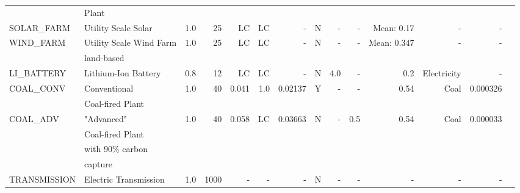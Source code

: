\begin{tabular}{llrrrrrrrrrrrr}
     &Plant&&&&&&&&&&&&\\
  SOLAR\_FARM &                                Utility Scale Solar &         1.0 &        25 &                      LC &                      LC &                    - &               N &                      - &       - &          Mean: 0.17 &          - &                     - &       \cite{nrel_2020_2020} \\
   WIND\_FARM &                Utility Scale Wind Farm &         1.0 &        25 &                      LC &                      LC &                    - &               N &                      - &       - &         Mean: 0.347 &          - &                     - &     \cite{nrel_2020_2020}   \\
   &land-based&&&&&&&&&&&&\\
  LI\_BATTERY &                                Lithium-Ion Battery &         0.8 &        12 &                      LC &                      LC &                    - &               N &                      4.0 &       - &                 0.2 &  Electricity &                     - &     \cite{nrel_2020_2020}   \\
   COAL\_CONV &                      Conventional  &         1.0 &        40 &                  0.041 &                     1.0 &                0.02137 &               Y &                      - &       - &                0.54 &         Coal &                     0.000326 &    \cite{sargent__lundy_capital_2020}    \\
   &Coal-fired Plant&&&&&&&&&&&&\\
    COAL\_ADV & "Advanced"   &         1.0 &        40 &                      0.058 &                      LC &                0.03663 &               N &                      - &       0.5 &                0.54 &         Coal &                     0.000033 &    \cite{nrel_2020_2020}    \\
    &Coal-fired Plant&&&&&&&&&&&&\\
    &with 90\% carbon&&&&&&&&&&&&\\
    & capture&&&&&&&&&&&&\\
TRANSMISSION &                        Electric Transmission &         1.0 &      1000 &                     - &                     - &                    - &               N &                      - &       - &                 - &          - &                     - &        \\
\bottomrule
\end{tabular}
